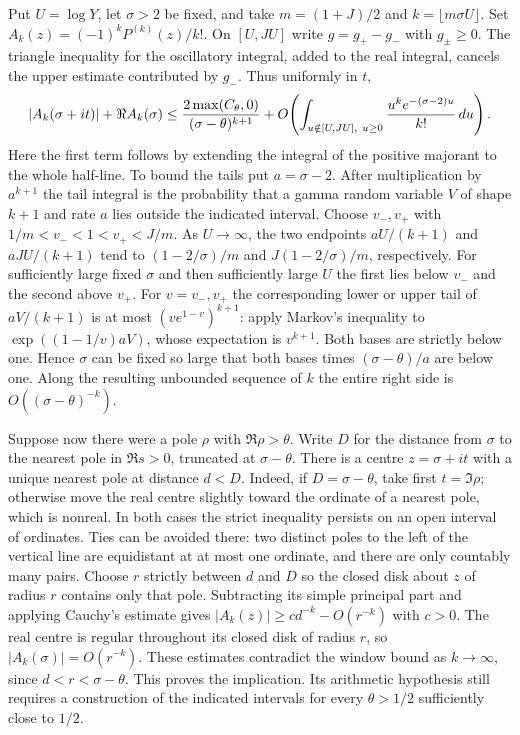 \documentclass[11pt]{amsart}
\theoremstyle{definition}
\theoremstyle{remark}
\begin{document}
Put $U=\log Y$, let $\sigma>2$ be fixed, and take
$m=(1+J)/2$ and $k=\lfloor m\sigma U\rfloor$. Set $A_k(z)=(-1)^kP^{(k)}(z)/k!$.
On $[U,JU]$ write $g=g_+-g_-$ with $g_\pm\ge0$. The triangle
inequality for the oscillatory integral, added to the real integral,
cancels the upper estimate contributed by $g_-$. Thus uniformly in $t$,
\[
 |A_k(\sigma+it)|+\Re A_k(\sigma)
 \le {2\max(C_\theta,0)\over(\sigma-\theta)^{k+1}}
 +O\!\left(\int_{u\notin[U,JU],\ u\ge0}
          {u^k e^{-(\sigma-2)u}\over k!}\,du\right).
\]
Here the first term follows by extending the integral of the positive
majorant to the whole half-line. To bound the tails put $a=\sigma-2$.
After multiplication by $a^{k+1}$ the tail integral is the probability
that a gamma random variable $V$ of shape $k+1$ and rate $a$ lies
outside the indicated interval. Choose $v_-,v_+$ with $1/m<v_-<1<v_+<J/m$.
As $U\to\infty$, the two endpoints $aU/(k+1)$ and $aJU/(k+1)$
tend to $(1-2/\sigma)/m$ and $J(1-2/\sigma)/m$, respectively.
For sufficiently large fixed $\sigma$ and then sufficiently large $U$
the first lies below $v_-$ and the second above $v_+$.
For $v=v_-,v_+$ the corresponding lower or upper tail of $aV/(k+1)$
is at most $(v e^{1-v})^{k+1}$: apply Markov's inequality to
$\exp((1-1/v)aV)$, whose expectation is $v^{k+1}$.
Both bases are strictly below one. Hence $\sigma$ can be fixed so large
that both bases times $(\sigma-\theta)/a$ are below one. Along the
resulting unbounded sequence of $k$ the entire right side is
$O((\sigma-\theta)^{-k})$.

Suppose now there were a pole $\rho$ with $\Re\rho>\theta$. Write
$D$ for the distance from $\sigma$ to the nearest pole in $\Re s>0$,
truncated at $\sigma-\theta$. There is a centre $z=\sigma+it$ with a
unique nearest pole at distance $d<D$. Indeed, if $D=\sigma-\theta$,
take first $t=\Im\rho$; otherwise move the real centre slightly
toward the ordinate of a nearest pole, which is nonreal. In both cases
the strict inequality persists on an open interval of ordinates.
Ties can be avoided there: two distinct poles to the left of the
vertical line are equidistant at at most one ordinate, and there are
only countably many pairs. Choose $r$ strictly between $d$ and $D$
so the closed disk about $z$ of radius $r$ contains only that pole.
Subtracting its simple principal part and applying Cauchy's estimate
gives $|A_k(z)|\ge c d^{-k}-O(r^{-k})$ with $c>0$.
The real centre is regular throughout its closed disk of radius $r$,
so $|A_k(\sigma)|=O(r^{-k})$. These estimates contradict the window
bound as $k\to\infty$, since $d<r<\sigma-\theta$.
This proves the implication. Its arithmetic hypothesis still requires
a construction of the indicated intervals for every $\theta>1/2$
sufficiently close to $1/2$.
\end{document}
